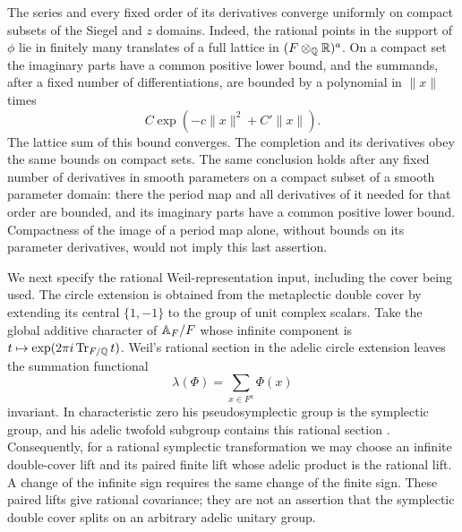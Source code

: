 The series and every fixed order of its derivatives converge
uniformly on compact subsets of the Siegel and \(z\) domains.
Indeed, the rational points in the support of \(\phi\) lie in
finitely many translates of a full lattice in
\((F\otimes_{\mathbb{Q}}\mathbb{R})^a\).  On a compact set the imaginary parts have
a common positive lower bound, and the summands, after a fixed
number of differentiations, are bounded by a polynomial in
\(\|x\|\) times
\[
 C\exp(-c\|x\|^2+C'\|x\|).
\]
The lattice sum of this bound converges.  The completion and its
derivatives obey the same bounds on compact sets.  The same
conclusion holds after any fixed number of derivatives in smooth
parameters on a compact subset of a smooth parameter domain:
there the period map and all derivatives of it needed for that
order are bounded, and its imaginary parts have a common positive
lower bound.  Compactness of the image of a period map alone,
without bounds on its parameter derivatives, would not imply this
last assertion.

We next specify the rational Weil-representation input, including
the cover being used.  The circle extension is obtained from the
metaplectic double cover by extending its central \(\{1,-1\}\)
to the group of unit complex scalars.  Take the global additive character of
\(\mathbb{A}_F/F\) whose infinite component is
\(t\mapsto\exp(2\pi i\operatorname{Tr}_{F/\mathbb{Q}}t)\).  Weil's rational section in
the adelic circle extension leaves the summation functional
\[
 \lambda(\Phi)=\sum_{x\in F^a}\Phi(x)
\]
invariant.  In characteristic zero his pseudosymplectic group is
the symplectic group, and his adelic twofold subgroup contains this
rational section
\cite[Ch.~III, nos.~31 and 41, Eq.~(39) and Theorem~6;
      Ch.~IV, no.~45, pp.~200--201]{Weil1964}.
Consequently, for a rational symplectic transformation we may
choose an infinite double-cover lift and its paired finite lift
whose adelic product is the rational lift.  A change of the
infinite sign requires the same change of the finite sign.
These paired lifts give rational covariance; they are not an
assertion that the symplectic double cover splits on an arbitrary
adelic unitary group.

